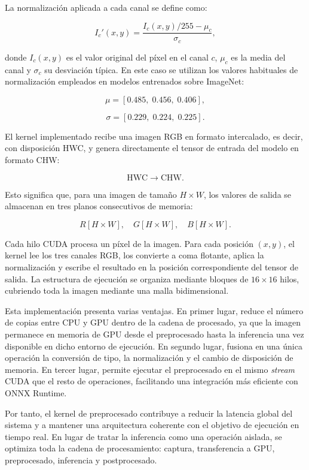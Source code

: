 La normalización aplicada a cada canal se define como:

\[
I_c'(x,y)=\frac{I_c(x,y)/255-\mu_c}{\sigma_c},
\]

donde \(I_c(x,y)\) es el valor original del píxel en el canal \(c\), \(\mu_c\) es la media del canal y \(\sigma_c\) su desviación típica. En este caso se utilizan los valores habituales de normalización empleados en modelos entrenados sobre ImageNet:

\[
\mu = [0.485,\;0.456,\;0.406],
\]

\[
\sigma = [0.229,\;0.224,\;0.225].
\]

El kernel implementado recibe una imagen RGB en formato intercalado, es decir, con disposición HWC, y genera directamente el tensor de entrada del modelo en formato CHW:

\[
\text{HWC} \rightarrow \text{CHW}.
\]

Esto significa que, para una imagen de tamaño \(H \times W\), los valores de salida se almacenan en tres planos consecutivos de memoria:

\[
R[H \times W], \quad G[H \times W], \quad B[H \times W].
\]

Cada hilo CUDA procesa un píxel de la imagen. Para cada posición \((x,y)\), el kernel lee los tres canales RGB, los convierte a coma flotante, aplica la normalización y escribe el resultado en la posición correspondiente del tensor de salida. La estructura de ejecución se organiza mediante bloques de \(16 \times 16\) hilos, cubriendo toda la imagen mediante una malla bidimensional.

Esta implementación presenta varias ventajas. En primer lugar, reduce el número de copias entre CPU y GPU dentro de la cadena de procesado, ya que la imagen permanece en memoria de GPU desde el preprocesado hasta la inferencia una vez disponible en dicho entorno de ejecución. En segundo lugar, fusiona en una única operación la conversión de tipo, la normalización y el cambio de disposición de memoria. En tercer lugar, permite ejecutar el preprocesado en el mismo \textit{stream} CUDA que el resto de operaciones, facilitando una integración más eficiente con ONNX Runtime.

Por tanto, el kernel de preprocesado contribuye a reducir la latencia global del sistema y a mantener una arquitectura coherente con el objetivo de ejecución en tiempo real. En lugar de tratar la inferencia como una operación aislada, se optimiza toda la cadena de procesamiento: captura, transferencia a GPU, preprocesado, inferencia y postprocesado.

